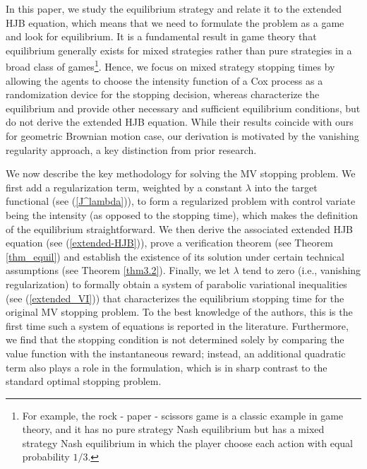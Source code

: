\documentclass[11pt]{article}
\begin{document}
In this paper, we study the equilibrium strategy and relate it to  the extended HJB equation, which means that we need  to formulate the problem as a game and look for equilibrium.   It is a fundamental result in game theory that equilibrium generally exists for mixed strategies rather than pure strategies in a broad class of games\footnote{For example, the rock - paper - scissors game is a classic example in game theory, and it has no pure strategy Nash equilibrium but has a mixed  strategy Nash equilibrium in which  the player choose each action with equal probability $1/3$. }. Hence,  we focus on mixed strategy stopping times by allowing the agents to  choose the intensity function of a Cox process as a randomization device for the stopping decision, whereas \cite{christensen2020time, peskir2006optimal} characterize the equilibrium and  provide other necessary and sufficient equilibrium conditions, but do not derive the extended HJB equation. While their results coincide with ours for geometric Brownian motion case, our derivation is motivated by the vanishing regularity approach, a key distinction from prior research. 


We now describe the key methodology for solving the MV stopping problem.  We first add a regularization term, weighted by a constant $\lambda$ into the target functional (see (\ref{J^lambda})), to form a regularized problem with control variate being the intensity (as opposed to the stopping time), which makes   the definition of the equilibrium  straightforward. We then derive the associated extended HJB equation (see (\ref{extended-HJB})), prove a verification theorem (see Theorem \ref{thm_equil})  and establish the existence of its solution under certain technical assumptions (see Theorem \ref{thm3.2}). Finally, we  let $\lambda$ tend to zero (i.e., vanishing regularization) to formally obtain a system of parabolic variational inequalities (see (\ref{extended_VI})) that characterizes the equilibrium stopping time for the original MV stopping problem. To the best knowledge of the authors, this is the first time  such a system of equations is reported  in the literature. Furthermore, we find that the stopping condition is not determined solely by comparing the value function with the instantaneous reward; instead, an additional quadratic term also plays a role in the formulation, which is in sharp contrast to the standard  optimal stopping problem.
\end{document}
